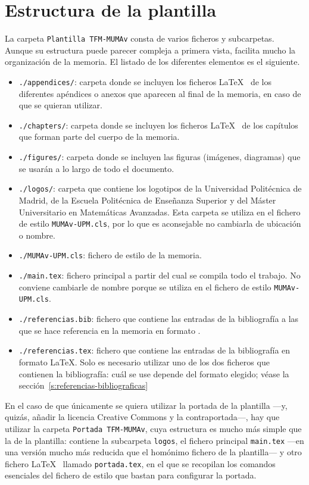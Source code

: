 
\chapter{Estructura de la plantilla}

La carpeta \texttt{Plantilla TFM-MUMAv} consta de varios ficheros y subcarpetas. Aunque su estructura puede parecer compleja a primera vista, facilita mucho la organización de la memoria. El listado de los diferentes elementos es el siguiente.
\begin{itemize}
    \item \texttt{./appendices/}: carpeta donde se incluyen los ficheros \LaTeX~ de los diferentes apéndices o anexos que aparecen al final de la memoria, en caso de que se quieran utilizar.
    \item \texttt{./chapters/}: carpeta donde se incluyen los ficheros \LaTeX~ de los capítulos que forman parte del cuerpo de la memoria.
    \item \texttt{./figures/}: carpeta donde se incluyen las figuras (imágenes, diagramas) que se usarán a lo largo de todo el documento.
    \item \texttt{./logos/}: carpeta que contiene los logotipos de la Universidad Politécnica de Madrid, de la Escuela Politécnica de Enseñanza Superior y del Máster Universitario en Matemáticas Avanzadas. Esta carpeta se utiliza en el fichero de estilo \texttt{MUMAv-UPM.cls}, por lo que es aconsejable no cambiarla de ubicación o nombre.
    \item \texttt{./MUMAv-UPM.cls}: fichero de estilo de la memoria. 
    \item \texttt{./main.tex}: fichero principal a partir del cual se compila todo el trabajo. No conviene cambiarle de nombre porque se utiliza en el fichero de estilo \texttt{MUMAv-UPM.cls}.
    \item \texttt{./referencias.bib}: fichero que contiene las entradas de la bibliografía a las que se hace referencia en la memoria en formato .
    \item \texttt{./referencias.tex}: fichero que contiene las entradas de la bibliografía en formato \LaTeX. Solo es necesario utilizar uno de los dos ficheros que contienen la bibliografía: cuál se use depende del formato elegido; véase la sección~\ref{s:referencias-bibliograficas}
\end{itemize}    

En el caso de que únicamente se quiera utilizar la portada de la plantilla ---y, quizás, añadir la licencia Creative Commons y la contraportada---, hay que utilizar la carpeta \texttt{Portada TFM-MUMAv}, cuya estructura es mucho más simple que la de la plantilla: contiene la subcarpeta \texttt{logos}, el fichero principal \texttt{main.tex} ---en una versión mucho más reducida que el homónimo fichero de la plantilla--- y otro fichero \LaTeX~ llamado \texttt{portada.tex}, en el que se recopilan los comandos esenciales del fichero de estilo que bastan para configurar la portada. 

